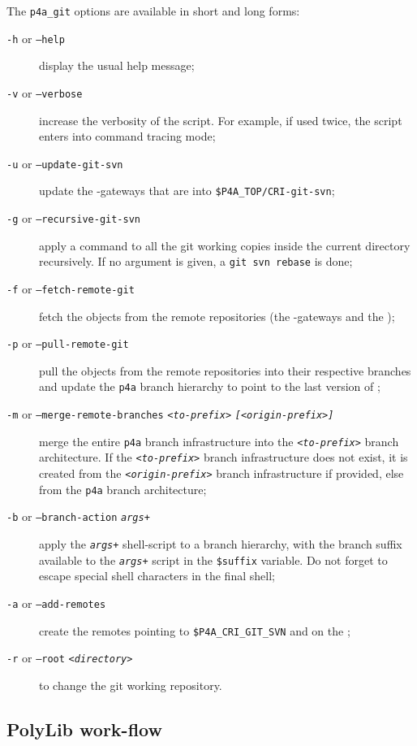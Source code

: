 \documentclass[a4paper]{article}
\begin{document}
The \verb|p4a_git| options are available in short and long forms:
\begin{description}
\item[\texttt{-h} or \texttt{--help}] display the usual help message;
\item[\texttt{-v} or \texttt{--verbose}] increase the verbosity of the
  script. For example, if used twice, the script enters into command
  tracing mode;
\item[\texttt{-u} or \texttt{--update-git-svn}] update the \Apips{}
  \Agit-\Asvn gateways that are into \verb|$P4A_TOP/CRI-git-svn|;%
\item[\texttt{-g} or \texttt{--recursive-git-svn}] apply a \Agit command
  to all the git working copies inside the current directory
  recursively. If no argument is given, a \texttt{git svn rebase} is done;
\item[\texttt{-f} or \texttt{--fetch-remote-git}] fetch the objects from
  the remote \Agit repositories (the \Apips{} \Agit-\Asvn gateways and the
  \Apolylib{} \Agit);
\item[\texttt{-p} or \texttt{--pull-remote-git}] pull the objects from the
  remote \Agit repositories into their respective branches and update the
  \texttt{p4a} branch hierarchy to point to the last version of \Apfa;
\item[\texttt{-m} or \texttt{--merge-remote-branches}
  \texttt{\emph{<to-prefix>}} \texttt{\emph{[<origin-prefix>]}}] merge
  the entire
  \texttt{p4a} branch infrastructure into the
  \texttt{\emph{<to-prefix>}} branch architecture. If the
  \texttt{\emph{<to-prefix>}} branch infrastructure does not exist, it is
  created from the \texttt{\emph{<origin-prefix>}} branch infrastructure
  if provided, else from the \texttt{p4a} branch architecture;
\item[\texttt{-b} or \texttt{--branch-action} \texttt{\emph{args+}}] apply
  the \texttt{\emph{args+}} shell-script to a branch hierarchy, with the
  branch suffix available to the \texttt{\emph{args+}} script in the
  \verb|$suffix| variable. Do not forget to escape special shell
  characters in the final shell;
\item[\texttt{-a} or \texttt{--add-remotes}] create the remotes pointing
  to \verb|$P4A_CRI_GIT_SVN| and on the \Apolylib{} \Agit;
\item[\texttt{-r} or \texttt{--root} \texttt{<\emph{directory}>}] to
  change the git working repository.
\end{description}


\subsection{PolyLib work-flow}
\label{sec:polylib-workflow}
\end{document}
